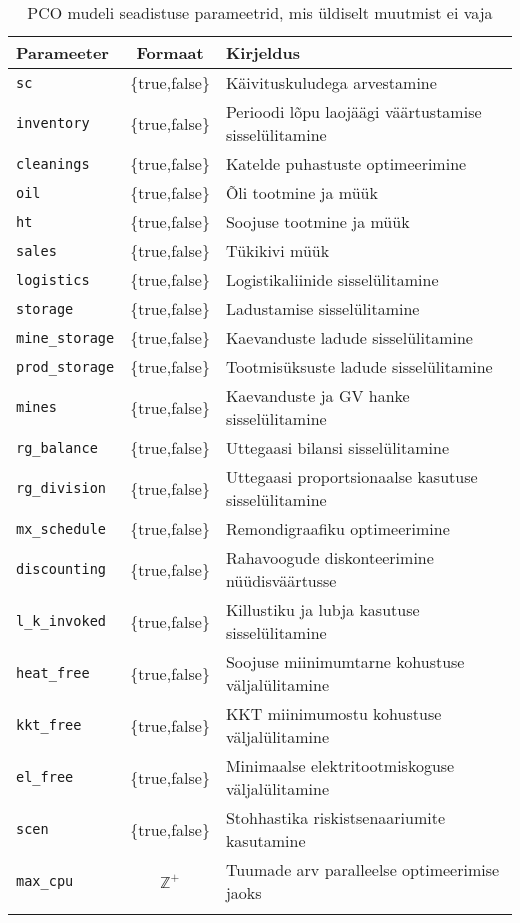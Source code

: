 \documentclass[10pt,a4paper]{article}
\begin{document}
\begin{table}
\begin{tabular}{l c l}
Parameeter & Formaat & Kirjeldus \\
\hline
\texttt{sc}              &  \{true,false\}&  Käivituskuludega arvestamine \\
\texttt{inventory}       &  \{true,false\}&  Perioodi lõpu laojäägi väärtustamise sisselülitamine\\
\texttt{cleanings}       &  \{true,false\}&  Katelde puhastuste optimeerimine \\
\texttt{oil}             &  \{true,false\}&  Õli tootmine ja müük\\
\texttt{ht}              &  \{true,false\}&  Soojuse tootmine ja müük\\
\texttt{sales}           &  \{true,false\}&  Tükikivi müük \\
\texttt{logistics}       &  \{true,false\}&  Logistikaliinide sisselülitamine \\
\texttt{storage}         &  \{true,false\}&  Ladustamise sisselülitamine \\
\texttt{mine\_storage}   &  \{true,false\}&  Kaevanduste ladude sisselülitamine \\
\texttt{prod\_storage}   &  \{true,false\}&  Tootmisüksuste ladude sisselülitamine \\
\texttt{mines}           &  \{true,false\}&  Kaevanduste ja GV hanke sisselülitamine \\
\texttt{rg\_balance}     &  \{true,false\}&  Uttegaasi bilansi sisselülitamine \\
\texttt{rg\_division}    &  \{true,false\}&  Uttegaasi proportsionaalse kasutuse sisselülitamine\\
\texttt{mx\_schedule}    &  \{true,false\}&  Remondigraafiku optimeerimine \\
\texttt{discounting}     &  \{true,false\}&  Rahavoogude diskonteerimine nüüdisväärtusse\\
\texttt{l\_k\_invoked}   &  \{true,false\}&  Killustiku ja lubja kasutuse sisselülitamine \\
\texttt{heat\_free}      &  \{true,false\}&  Soojuse miinimumtarne kohustuse väljalülitamine \\
\texttt{kkt\_free}       &  \{true,false\}&  KKT miinimumostu kohustuse väljalülitamine \\
\texttt{el\_free}        &  \{true,false\}&  Minimaalse elektritootmiskoguse väljalülitamine \\
\texttt{scen}            &  \{true,false\}&  Stohhastika riskistsenaariumite kasutamine \\
\texttt{max\_cpu}        &  $\mathbb{Z}^+$&  Tuumade arv paralleelse optimeerimise jaoks \\
\\  
\end{tabular}
\caption{PCO mudeli seadistuse parameetrid, mis üldiselt muutmist ei vaja}
\label{tab:conf_spec}
\end{table}


\appendix






{}
\end{document}
